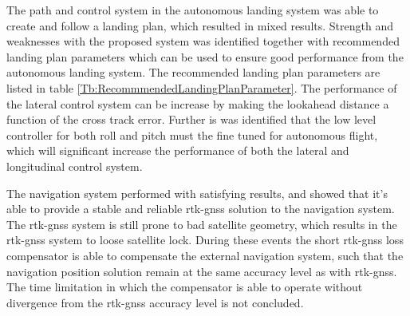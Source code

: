 The path and control system in the autonomous landing system was able to create and follow a landing plan, which resulted in mixed results. Strength and weaknesses with the proposed system was identified together with recommended landing plan parameters which can be used to ensure good performance from the autonomous landing system. The recommended landing plan parameters are listed in table \ref{Tb:RecommmendedLandingPlanParameter}. The performance of the lateral control system can be increase by making the lookahead distance a function of the cross track error. Further is was identified that the low level controller for both roll and pitch must the fine tuned for autonomous flight, which will significant increase the performance of both the lateral and longitudinal control system.

The navigation system performed with satisfying results, and showed that it's able to provide a stable and reliable \gls{rtk-gnss} solution to the navigation system. The \gls{rtk-gnss} system is still prone to bad satellite geometry, which results in the \gls{rtk-gnss} system to loose satellite lock. During these events the short \gls{rtk-gnss} loss compensator is able to compensate the external navigation system, such that the navigation position solution remain at the same accuracy level as with \gls{rtk-gnss}. The time limitation in which the compensator is able to operate without divergence from the \gls{rtk-gnss} accuracy level is not concluded.
